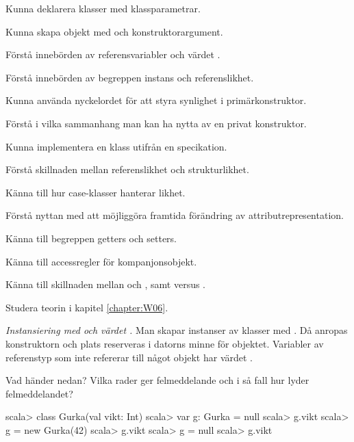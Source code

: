 

\Exercise{\ExeWeekSIX}

\begin{Goals}
\item Kunna deklarera klasser med klassparametrar.
\item Kunna skapa objekt med  och konstruktorargument.
\item Förstå innebörden av referensvariabler och värdet .
\item Förstå innebörden av begreppen instans och referenslikhet.
\item Kunna använda nyckelordet  för att styra synlighet i primärkonstruktor.
\item Förstå i vilka sammanhang man kan ha nytta av en privat konstruktor.
\item Kunna implementera en klass utifrån en specikation.
\item Förstå skillnaden mellan referenslikhet och strukturlikhet.
\item Känna till hur case-klasser hanterar likhet.
\item Förstå nyttan med att möjliggöra framtida förändring av attributrepresentation.
\item Känna till begreppen getters och setters. 
\item Känna till accessregler för kompanjonsobjekt.
\item Känna till skillnaden mellan \code{==} och , samt \code{!=} versus .
\end{Goals}

\begin{Preparations}
\item Studera teorin i kapitel \ref{chapter:W06}.
\end{Preparations}

\BasicTasks %

\Task \emph{Instansiering med  och värdet .} Man skapar instanser av klasser med . Då anropas konstruktorn och plats reserveras i datorns minne för objektet. Variabler av referenstyp som inte refererar till något objekt har värdet . 

\Subtask Vad händer nedan? Vilka rader ger felmeddelande och i så fall hur lyder felmeddelandet?

\begin{REPL}
scala> class Gurka(val vikt: Int)
scala> var g: Gurka = null
scala> g.vikt
scala> g = new Gurka(42)
scala> g.vikt
scala> g = null
scala> g.vikt
\end{REPL}

